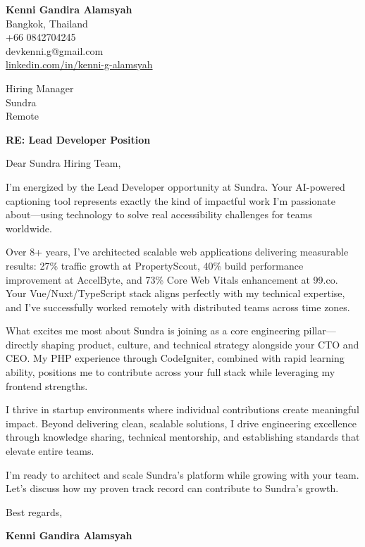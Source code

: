 \documentclass[11pt]{article}
\begin{document}
\begin{flushleft}
\textbf{Kenni Gandira Alamsyah}\\
Bangkok, Thailand\\
+66 0842704245\\
devkenni.g@gmail.com\\
\href{https://www.linkedin.com/in/kenni-g-alamsyah/}{linkedin.com/in/kenni-g-alamsyah}
\end{flushleft}

\vspace{1em}

\begin{flushleft}
Hiring Manager\\
Sundra\\
Remote
\end{flushleft}

\vspace{1em}

\textbf{RE: Lead Developer Position}

\vspace{1em}

Dear Sundra Hiring Team,

I'm energized by the Lead Developer opportunity at Sundra. Your AI-powered captioning tool represents exactly the kind of impactful work I'm passionate about—using technology to solve real accessibility challenges for teams worldwide.

Over 8+ years, I've architected scalable web applications delivering measurable results: 27\% traffic growth at PropertyScout, 40\% build performance improvement at AccelByte, and 73\% Core Web Vitals enhancement at 99.co. Your Vue/Nuxt/TypeScript stack aligns perfectly with my technical expertise, and I've successfully worked remotely with distributed teams across time zones.

What excites me most about Sundra is joining as a core engineering pillar—directly shaping product, culture, and technical strategy alongside your CTO and CEO. My PHP experience through CodeIgniter, combined with rapid learning ability, positions me to contribute across your full stack while leveraging my frontend strengths.

I thrive in startup environments where individual contributions create meaningful impact. Beyond delivering clean, scalable solutions, I drive engineering excellence through knowledge sharing, technical mentorship, and establishing standards that elevate entire teams.

I'm ready to architect and scale Sundra's platform while growing with your team. Let's discuss how my proven track record can contribute to Sundra's growth.

\vspace{1em}

Best regards,

\textbf{Kenni Gandira Alamsyah}
\end{document}
